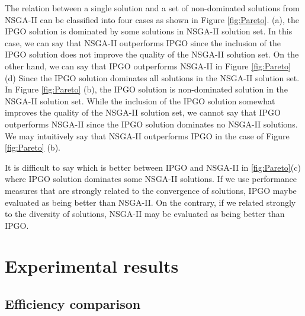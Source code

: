 \documentclass{llncs}
\begin{document}
The relation between a single solution and a set of non-dominated solutions from NSGA-II can be classified into four cases as shown
in Figure \ref{fig:Pareto}. (a), the IPGO solution is dominated by some solutions in NSGA-II solution set. In this case, we can
say that NSGA-II outperforms IPGO since the inclusion of the IPGO solution does not improve the quality of the NSGA-II solution set.
On the other hand, we can say that IPGO outperforms NSGA-II in Figure \ref{fig:Pareto} (d) Since the IPGO solution dominates all
solutions in the NSGA-II solution set. In Figure \ref{fig:Pareto} (b), the IPGO solution is non-dominated solution in the NSGA-II 
solution set. While the inclusion of the IPGO solution somewhat improves the quality of the NSGA-II solution set, we cannot say that
IPGO outperforms NSGA-II since the IPGO solution dominates no NSGA-II solutions. We may intuitively say that NSGA-II outperforms
IPGO in the case of Figure \ref{fig:Pareto} (b).

It is difficult to say which is better between IPGO and NSGA-II in \ref{fig:Pareto}(c) where IPGO solution dominates some 
NSGA-II solutions. If we use performance measures that are strongly related to the convergence of solutions, 
IPGO maybe evaluated as being better than NSGA-II. 
On the contrary, if we related strongly to the diversity of solutions, NSGA-II may be evaluated as being better than IPGO.




\section{Experimental results}
\label{sec:results}
\subsection{Efficiency comparison}
\end{document}
